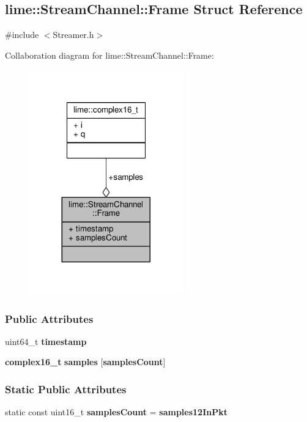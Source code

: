 \subsection{lime\+:\+:Stream\+Channel\+:\+:Frame Struct Reference}
\label{structlime_1_1StreamChannel_1_1Frame}


{\ttfamily \#include $<$Streamer.\+h$>$}



Collaboration diagram for lime\+:\+:Stream\+Channel\+:\+:Frame\+:
\nopagebreak
\begin{figure}[H]
\begin{center}
\leavevmode
\includegraphics[width=188pt]{d6/d28/structlime_1_1StreamChannel_1_1Frame__coll__graph}
\end{center}
\end{figure}
\subsubsection*{Public Attributes}
\begin{DoxyCompactItemize}
\item 
uint64\+\_\+t {\bf timestamp}
\item 
{\bf complex16\+\_\+t} {\bf samples} [{\bf samples\+Count}]
\end{DoxyCompactItemize}
\subsubsection*{Static Public Attributes}
\begin{DoxyCompactItemize}
\item 
static const uint16\+\_\+t {\bf samples\+Count} = {\bf samples12\+In\+Pkt}
\end{DoxyCompactItemize}


